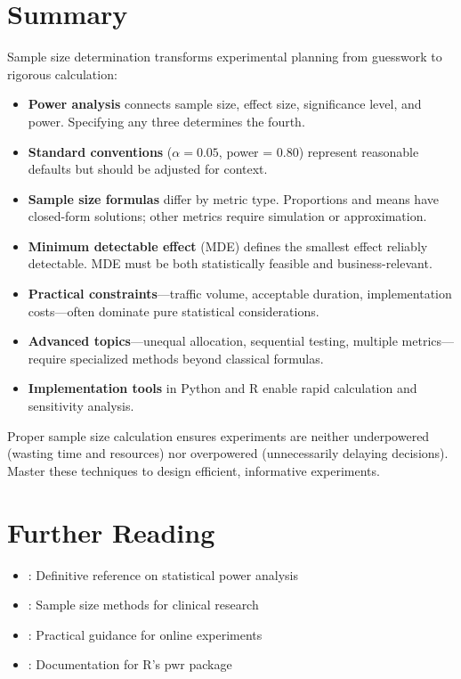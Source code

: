 \section{Summary}

Sample size determination transforms experimental planning from guesswork to rigorous calculation:

\begin{itemize}
    \item \textbf{Power analysis} connects sample size, effect size, significance level, and power. Specifying any three determines the fourth.

    \item \textbf{Standard conventions} ($\alpha = 0.05$, power = 0.80) represent reasonable defaults but should be adjusted for context.

    \item \textbf{Sample size formulas} differ by metric type. Proportions and means have closed-form solutions; other metrics require simulation or approximation.

    \item \textbf{Minimum detectable effect} (MDE) defines the smallest effect reliably detectable. MDE must be both statistically feasible and business-relevant.

    \item \textbf{Practical constraints}—traffic volume, acceptable duration, implementation costs—often dominate pure statistical considerations.

    \item \textbf{Advanced topics}—unequal allocation, sequential testing, multiple metrics—require specialized methods beyond classical formulas.

    \item \textbf{Implementation tools} in Python and R enable rapid calculation and sensitivity analysis.
\end{itemize}

Proper sample size calculation ensures experiments are neither underpowered (wasting time and resources) nor overpowered (unnecessarily delaying decisions). Master these techniques to design efficient, informative experiments.

\section{Further Reading}

\begin{itemize}
    \item \citet{cohen1988statistical}: Definitive reference on statistical power analysis
    \item \citet{chow2007sample}: Sample size methods for clinical research
    \item \citet{kohavi2020trustworthy}: Practical guidance for online experiments
    \item \citet{champely2020pwr}: Documentation for R's pwr package
\end{itemize}

